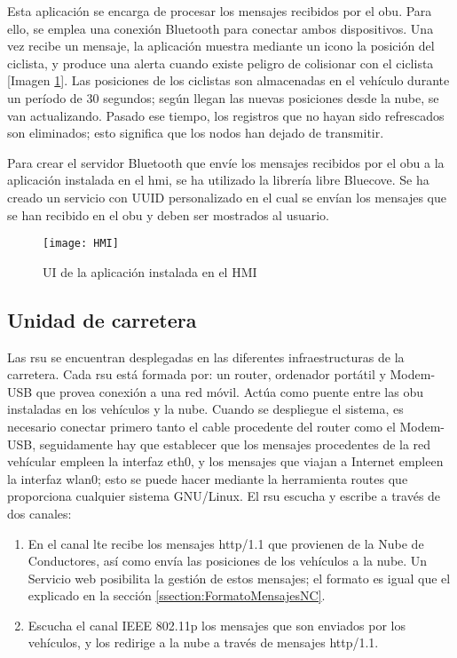 Esta aplicación se encarga de procesar los mensajes recibidos por el \gls{obu}. Para ello, se emplea una conexión Bluetooth para conectar ambos dispositivos. Una vez recibe un mensaje, la aplicación muestra mediante un icono la posición del ciclista, y produce una alerta cuando existe peligro de colisionar con el ciclista [Imagen \ref{figure:HMI}]. Las posiciones de los ciclistas son almacenadas en el vehículo durante un período de 30 segundos; según llegan las nuevas posiciones desde la nube, se van actualizando. Pasado ese tiempo, los registros que no hayan sido refrescados son eliminados; esto significa que los nodos han dejado de transmitir.

Para crear el servidor Bluetooth que envíe los mensajes recibidos por el \gls{obu} a la aplicación instalada en el \gls{hmi}, se ha utilizado la librería libre Bluecove. Se ha creado un servicio con UUID personalizado en el cual se envían los mensajes que se han recibido en el \gls{obu} y deben ser mostrados al usuario.

\begin{figure}[H]
	\begin{center}
		\texttt{[image: HMI]}
		\caption{UI de la aplicación instalada en el HMI}
		\label{figure:HMI}
	\end{center}
\end{figure}

\subsection{Unidad de carretera}
Las \gls{rsu} se encuentran desplegadas en las diferentes infraestructuras de la carretera. Cada \gls{rsu} está formada por: un router, ordenador portátil y Modem-USB que provea conexión a una red móvil. Actúa como puente entre las \gls{obu} instaladas en los vehículos y la nube. Cuando se despliegue el sistema, es necesario conectar primero tanto el cable procedente del router como el Modem-USB, seguidamente hay que establecer que los mensajes procedentes de la red vehícular empleen la interfaz eth0, y los mensajes que viajan a Internet empleen la interfaz wlan0; esto se puede hacer mediante la herramienta routes que proporciona cualquier sistema GNU/Linux. El \gls{rsu} escucha y escribe a través de dos canales:
\begin{enumerate}
	\item En el canal \gls{lte} recibe los mensajes \Gls{http/1.1} que provienen de la Nube de Conductores, así como envía las posiciones de los vehículos a la nube. Un Servicio web posibilita la gestión de estos mensajes; el formato es igual que el explicado en la sección \ref{ssection:FormatoMensajesNC}.
		
	\item Escucha el canal IEEE 802.11p los mensajes que son enviados por los vehículos, y los redirige a la nube a través de mensajes \Gls{http/1.1}.
\end{enumerate}

